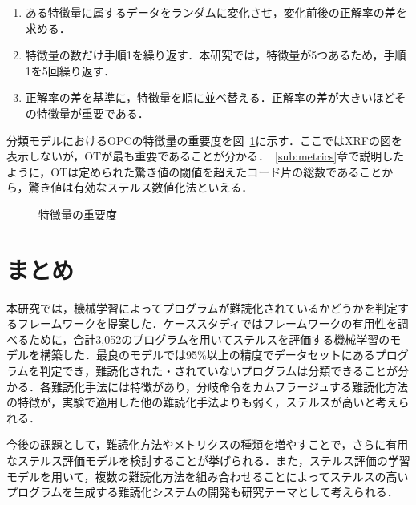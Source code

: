 \documentclass[12pt]{jarticle}
\begin{document}
\begin{enumerate}[label=\arabic*.]
  \item ある特徴量に属するデータをランダムに変化させ，変化前後の正解率の差を求める．
  \item 特徴量の数だけ手順1を繰り返す．本研究では，特徴量が5つあるため，手順1を5回繰り返す．
  \item 正解率の差を基準に，特徴量を順に並べ替える．正解率の差が大きいほどその特徴量が重要である．
\end{enumerate}

分類モデルにおけるOPCの特徴量の重要度を図~\ref{fig:featureImportance}に示す．ここではXRFの図を表示しないが，OTが最も重要であることが分かる．~\ref{sub:metrics}章で説明したように，OTは定められた驚き値の閾値を超えたコード片の総数であることから，驚き値は有効なステルス数値化法といえる．

\begin{figure}[!h]
\centering
{}
\caption{特徴量の重要度}
\label{fig:featureImportance}
\end{figure}

\newpage

\section{まとめ}  \label{sec:concl}
本研究では，機械学習によってプログラムが難読化されているかどうかを判定するフレームワークを提案した．ケーススタディではフレームワークの有用性を調べるために，合計3,052のプログラムを用いてステルスを評価する機械学習のモデルを構築した．最良のモデルでは95\%以上の精度でデータセットにあるプログラムを判定でき，難読化された・されていないプログラムは分類できることが分かる．各難読化手法には特徴があり，分岐命令をカムフラージュする難読化方法の特徴が，実験で適用した他の難読化手法よりも弱く，ステルスが高いと考えられる．

今後の課題として，難読化方法やメトリクスの種類を増やすことで，さらに有用なステルス評価モデルを検討することが挙げられる．また，ステルス評価の学習モデルを用いて，複数の難読化方法を組み合わせることによってステルスの高いプログラムを生成する難読化システムの開発も研究テーマとして考えられる．
\end{document}
